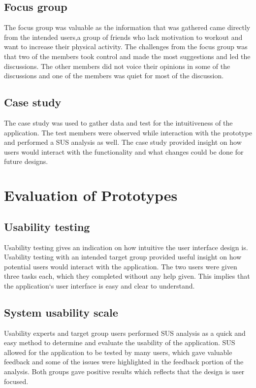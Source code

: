 \subsection{Focus group}
The focus group was valuable as the information that was gathered came directly from the intended users,a group of friends who lack motivation to workout and want to increase their physical activity. The challenges from the focus group was that two of the members took control and made the most suggestions and led the discussions. The other members did not voice their opinions in some of the discussions and one of the members was quiet for most of the discussion. 


\subsection{Case study}
The case study was used to gather data and test for the intuitiveness of the application. The test members were observed while interaction with the prototype and performed a SUS analysis as well. The case study provided insight on how users would interact with the functionality and what changes could be done for future designs.

\section{Evaluation of Prototypes}

\subsection{Usability testing}
Usability testing gives an indication on how intuitive the user interface design is. Usability testing with an intended target group provided useful insight on how potential users would interact with the application. The two users were given three tasks each, which they completed without any help given. This implies that the application`s user interface is easy and clear to understand. 
\subsection{System usability scale}
Usability experts and target group users performed SUS analysis as a quick and easy method to determine and evaluate the usability of the application. SUS allowed for the application to be tested by many users, which gave valuable feedback and some of the issues were highlighted in the feedback portion of the analysis. Both groups gave positive results which reflects that the design is user focused.

